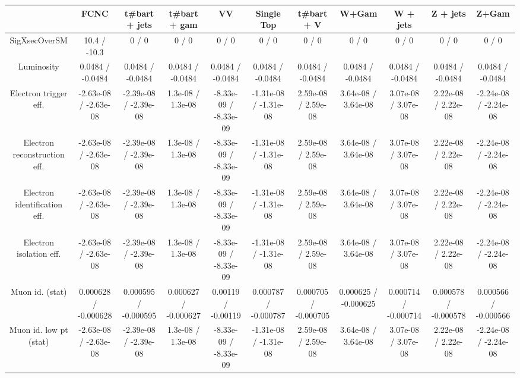 \begin{table}[htbp]
\begin{center}
\footnotesize
\begin{tabular}{|c|c|c|c|c|c|c|c|c|c|c|}
\hline 
      & FCNC      & t#bar{t} + jets      & t#bar{t} +  gam      & VV      & Single Top      & t#bar{t} + V      & W+Gam      & W + jets      & Z + jets      & Z+Gam \\ 
\hline 
 SigXsecOverSM & 10.4 / -10.3 & 0 / 0 & 0 / 0 & 0 / 0 & 0 / 0 & 0 / 0 & 0 / 0 & 0 / 0 & 0 / 0 & 0 / 0 \\ 
  Luminosity & 0.0484 / -0.0484 & 0.0484 / -0.0484 & 0.0484 / -0.0484 & 0.0484 / -0.0484 & 0.0484 / -0.0484 & 0.0484 / -0.0484 & 0.0484 / -0.0484 & 0.0484 / -0.0484 & 0.0484 / -0.0484 & 0.0484 / -0.0484 \\ 
  Electron trigger eff. & -2.63e-08 / -2.63e-08 & -2.39e-08 / -2.39e-08 & 1.3e-08 / 1.3e-08 & -8.33e-09 / -8.33e-09 & -1.31e-08 / -1.31e-08 & 2.59e-08 / 2.59e-08 & 3.64e-08 / 3.64e-08 & 3.07e-08 / 3.07e-08 & 2.22e-08 / 2.22e-08 & -2.24e-08 / -2.24e-08 \\ 
  Electron reconstruction eff. & -2.63e-08 / -2.63e-08 & -2.39e-08 / -2.39e-08 & 1.3e-08 / 1.3e-08 & -8.33e-09 / -8.33e-09 & -1.31e-08 / -1.31e-08 & 2.59e-08 / 2.59e-08 & 3.64e-08 / 3.64e-08 & 3.07e-08 / 3.07e-08 & 2.22e-08 / 2.22e-08 & -2.24e-08 / -2.24e-08 \\ 
  Electron identification eff. & -2.63e-08 / -2.63e-08 & -2.39e-08 / -2.39e-08 & 1.3e-08 / 1.3e-08 & -8.33e-09 / -8.33e-09 & -1.31e-08 / -1.31e-08 & 2.59e-08 / 2.59e-08 & 3.64e-08 / 3.64e-08 & 3.07e-08 / 3.07e-08 & 2.22e-08 / 2.22e-08 & -2.24e-08 / -2.24e-08 \\ 
  Electron isolation eff. & -2.63e-08 / -2.63e-08 & -2.39e-08 / -2.39e-08 & 1.3e-08 / 1.3e-08 & -8.33e-09 / -8.33e-09 & -1.31e-08 / -1.31e-08 & 2.59e-08 / 2.59e-08 & 3.64e-08 / 3.64e-08 & 3.07e-08 / 3.07e-08 & 2.22e-08 / 2.22e-08 & -2.24e-08 / -2.24e-08 \\ 
  Muon id. (stat) & 0.000628 / -0.000628 & 0.000595 / -0.000595 & 0.000627 / -0.000627 & 0.00119 / -0.00119 & 0.000787 / -0.000787 & 0.000705 / -0.000705 & 0.000625 / -0.000625 & 0.000714 / -0.000714 & 0.000578 / -0.000578 & 0.000566 / -0.000566 \\ 
  Muon id. low pt (stat) & -2.63e-08 / -2.63e-08 & -2.39e-08 / -2.39e-08 & 1.3e-08 / 1.3e-08 & -8.33e-09 / -8.33e-09 & -1.31e-08 / -1.31e-08 & 2.59e-08 / 2.59e-08 & 3.64e-08 / 3.64e-08 & 3.07e-08 / 3.07e-08 & 2.22e-08 / 2.22e-08 & -2.24e-08 / -2.24e-08 \\ 

\end{tabular}
\end{center}
\end{table}

